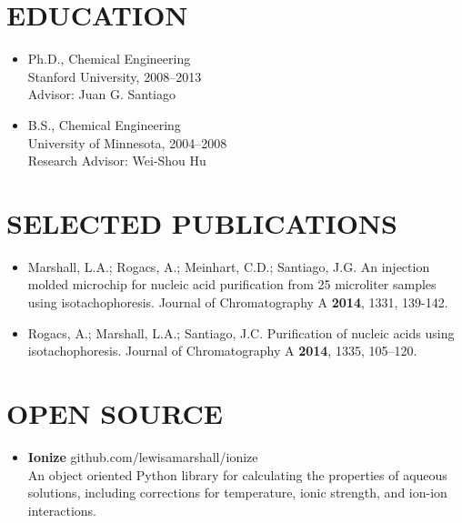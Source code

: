 \documentclass{res}
\begin{document}
\begin{resume}

\pagebreak

\section{EDUCATION}
    \begin{itemize}
  		\item{Ph.D., Chemical Engineering}\\
		  Stanford University, 2008--2013 \\
  		Advisor: Juan G. Santiago
  	  \item{B.S., Chemical Engineering}\\
		  University of Minnesota, 2004--2008 \\
      Research Advisor: Wei-Shou Hu
    \end{itemize}

 \section{SELECTED PUBLICATIONS}
  \begin{itemize}
  \item Marshall, L.A.; Rogacs, A.; Meinhart, C.D.; Santiago, J.G. An injection molded microchip for nucleic acid purification from 25 microliter samples using isotachophoresis. Journal of Chromatography A \textbf{2014}, 1331, 139-142.
  \item Rogacs, A.; Marshall, L.A.; Santiago, J.C. Purification of nucleic acids using isotachophoresis. Journal of Chromatography A \textbf{2014}, 1335, 105–120.
\end{itemize}

 \section{OPEN SOURCE}
   \begin{itemize}
     \item \textbf{Ionize} github.com/lewisamarshall/ionize\\
   An object oriented Python library for calculating the properties of
   aqueous solutions, including corrections for temperature, ionic strength, and ion-ion interactions.
 \end{itemize}



\end{resume}
\end{document}
